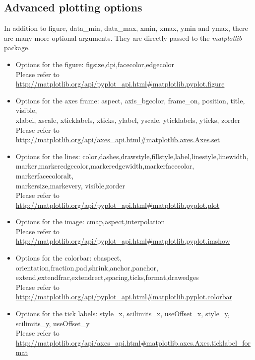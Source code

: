 \documentclass[11pt]{article}
\newcommand{\code}[1]{\colorbox{yellow!15}{\ttfamily #1}}
\begin{document}
\subsection{Advanced plotting options}
In addition to \code{figure}, \code{data\_min}, \code{data\_max}, \code{xmin}, \code{xmax}, \code{ymin} and \code{ymax}, there are many more optional arguments. They are directly passed to the \textit{matplotlib} package.
\begin{itemize}
\item Options for the figure: \code{figsize},\code{dpi},\code{facecolor},\code{edgecolor}\\
	Please refer to \url{http://matplotlib.org/api/pyplot_api.html#matplotlib.pyplot.figure}
\item Options for the axes frame: \code{aspect}, \code{axis\_bgcolor}, \code{frame\_on}, \code{position}, \code{title}, \code{visible},\\
	\code{xlabel}, \code{xscale}, \code{xticklabels}, \code{xticks}, \code{ylabel}, \code{yscale}, \code{yticklabels}, \code{yticks}, \code{zorder}\\
	Please refer to \url{http://matplotlib.org/api/axes_api.html#matplotlib.axes.Axes.set}
\item Options for the lines: \code{color},\code{dashes},\code{drawstyle},\code{fillstyle},\code{label},\code{linestyle},\code{linewidth},\\
	\code{marker},\code{markeredgecolor},\code{markeredgewidth},\code{markerfacecolor},	\code{markerfacecoloralt},\\
	\code{markersize},\code{markevery},	\code{visible},\code{zorder}\\
	Please refer to \url{http://matplotlib.org/api/pyplot_api.html#matplotlib.pyplot.plot}
\item Options for the image: \code{cmap},\code{aspect},\code{interpolation}\\
	Please refer to \url{http://matplotlib.org/api/pyplot_api.html#matplotlib.pyplot.imshow}
\item Options for the colorbar: \code{cbaspect}, \code{orientation},\code{fraction},\code{pad},\code{shrink},\code{anchor},\code{panchor},\\
	\code{extend},\code{extendfrac},\code{extendrect},\code{spacing},\code{ticks},\code{format},\code{drawedges}\\
	Please refer to \url{http://matplotlib.org/api/pyplot_api.html#matplotlib.pyplot.colorbar}
\item Options for the tick labels: \code{style\_x}, \code{scilimits\_x}, \code{useOffset\_x}, \code{style\_y}, \code{scilimits\_y}, \code{useOffset\_y}\\
	Please refer to \url{http://matplotlib.org/api/axes_api.html#matplotlib.axes.Axes.ticklabel_format}
\end{itemize}
\end{document}
